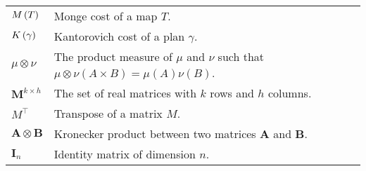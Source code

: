 \begin{tabular}{ l l }
	$M\left(T\right)$ & Monge cost of a map $T$. \\
	$K\left(\gamma\right)$ & Kantorovich cost of a plan $\gamma$. \\	
	$\mu \otimes \nu$ & The product measure of $\mu$ and $\nu$ such that $\mu \otimes \nu (A\times B)= \mu(A)\nu(B)$.\\
	$\mathbf{M}^{k\times h}$ & The set of real matrices with $k$ rows and $h$ columns. \\
	$M^\top$ & Transpose of a matrix $M$. \\
	$\pmb{A\otimes B}$& Kronecker product between two matrices $\mathbf{A}$ and $\mathbf{B}$.\\
	$\mathbf{I}_n$ & Identity matrix of dimension $n$.
\end{tabular}
